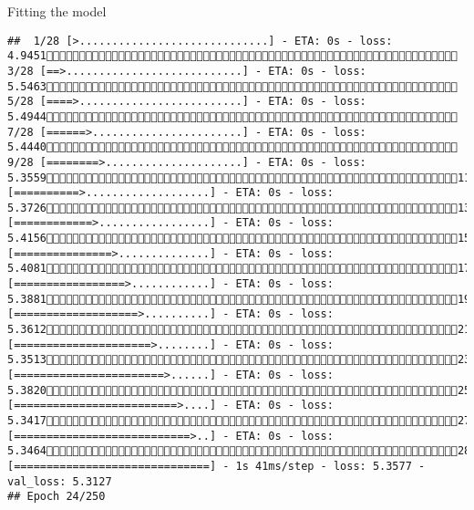 \documentclass[
  ignorenonframetext,
]{beamer}
\begin{document}
\begin{frame}[fragile]{Fitting the model}
\begin{verbatim}
##  1/28 [>.............................] - ETA: 0s - loss: 4.9451 3/28 [==>...........................] - ETA: 0s - loss: 5.5463 5/28 [====>.........................] - ETA: 0s - loss: 5.4944 7/28 [======>.......................] - ETA: 0s - loss: 5.4440 9/28 [========>.....................] - ETA: 0s - loss: 5.355911/28 [==========>...................] - ETA: 0s - loss: 5.372613/28 [============>.................] - ETA: 0s - loss: 5.415615/28 [===============>..............] - ETA: 0s - loss: 5.408117/28 [=================>............] - ETA: 0s - loss: 5.388119/28 [===================>..........] - ETA: 0s - loss: 5.361221/28 [=====================>........] - ETA: 0s - loss: 5.351323/28 [=======================>......] - ETA: 0s - loss: 5.382025/28 [=========================>....] - ETA: 0s - loss: 5.341727/28 [===========================>..] - ETA: 0s - loss: 5.346428/28 [==============================] - 1s 41ms/step - loss: 5.3577 - val_loss: 5.3127
## Epoch 24/250

\end{verbatim}
\end{frame}
\end{document}
